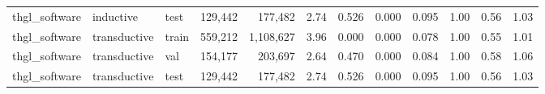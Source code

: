 \begin{table}[t]
{\begin{tabular}{lllrrrrrrrrr}
thgl\_software & inductive & test & 129,442 & 177,482 & 2.74 & 0.526 & 0.000 & 0.095 & 1.00 & 0.56 & 1.03 \\
thgl\_software & transductive & train & 559,212 & 1,108,627 & 3.96 & 0.000 & 0.000 & 0.078 & 1.00 & 0.55 & 1.01 \\
thgl\_software & transductive & val & 154,177 & 203,697 & 2.64 & 0.470 & 0.000 & 0.084 & 1.00 & 0.58 & 1.06 \\
thgl\_software & transductive & test & 129,442 & 177,482 & 2.74 & 0.526 & 0.000 & 0.095 & 1.00 & 0.56 & 1.03 \\
\bottomrule
\end{tabular}
}
\end{table}
